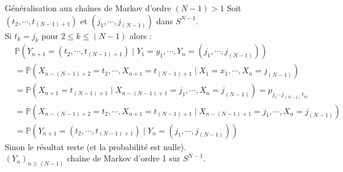 \documentclass[t]{beamer}
\newcommand{\probacond}[2]{%
\mathbb{P}(#1 \mid #2)%
}
\begin{document}
\begin{frame}{Généralisation aux chaînes de Markov d'ordre $(N-1) > 1$} %
    Soit $(t_{2}, \cdots, t_{(N-1)+1})$ et $(j_{1}, \cdots, j_{(N-1)})$ dans $S^{N-1}$. \\
    Si $t_k = j_k$ pour $2 \leq k \leq (N-1)$ alors :
    \begin{align*}
        &\probacond{Y_{n+1} = (t_{2}, \cdots, t_{(N-1)+1}) }{Y_{1} = y_{1}, \cdots,Y_{n} = (j_{1}, \cdots, j_{(N-1)})} \\
        &= \probacond{X_{n-(N-1)+2} = t_{2}, \cdots , X_{n+1} = t_{(N-1)+1} }{X_{1} = x_{1}, \cdots,X_{n} = j_{(N-1)}} \\
        &= \probacond{X_{n+1} = t_{(N-1)+1}}{X_{n-(N-1)+1} = j_{1}, \cdots,X_{n} = j_{(N-1)}} = p_{j_{1} \cdots j_{(N-1)} t_m} \\
        &{\scriptstyle = \probacond{X_{n-(N-1)+2} = t_{2}, \cdots , X_{n+1} = t_{(N-1)+1}}{X_{n-(N-1)+1} = j_{1}, \cdots,X_{n} = j_{(N-1)}}} \\
        &= \probacond{Y_{n+1} = (t_{2}, \cdots, t_{(N-1)+1}) }{Y_{n} = (j_{1}, \cdots, j_{(N-1)})} 
    \end{align*}
    Sinon le résultat reste (et la probabilité est nulle). \\
    $(Y_n)_{n \geq (N-1) }$ chaîne de Markov d'ordre 1 sur $S^{N-1}$. \\
\end{frame}
\end{document}
